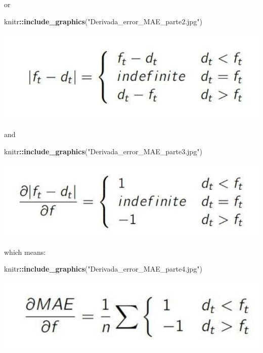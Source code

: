 \documentclass[
]{article}
\newenvironment{Shaded}{\begin{snugshade}}{\end{snugshade}}
\newcommand{\FunctionTok}[1]{\textcolor[rgb]{0.13,0.29,0.53}{\textbf{#1}}}
\newcommand{\NormalTok}[1]{#1}
\newcommand{\SpecialCharTok}[1]{\textcolor[rgb]{0.81,0.36,0.00}{\textbf{#1}}}
\newcommand{\StringTok}[1]{\textcolor[rgb]{0.31,0.60,0.02}{#1}}
\begin{document}
or

\begin{Shaded}
\begin{Highlighting}[]
\NormalTok{knitr}\SpecialCharTok{::}\FunctionTok{include\_graphics}\NormalTok{(}\StringTok{"Derivada\_error\_MAE\_parte2.jpg"}\NormalTok{)}
\end{Highlighting}
\end{Shaded}

\includegraphics{Derivada_error_MAE_parte2.jpg}

and

\begin{Shaded}
\begin{Highlighting}[]
\NormalTok{knitr}\SpecialCharTok{::}\FunctionTok{include\_graphics}\NormalTok{(}\StringTok{"Derivada\_error\_MAE\_parte3.jpg"}\NormalTok{)}
\end{Highlighting}
\end{Shaded}

\includegraphics{Derivada_error_MAE_parte3.jpg}

which means:

\begin{Shaded}
\begin{Highlighting}[]
\NormalTok{knitr}\SpecialCharTok{::}\FunctionTok{include\_graphics}\NormalTok{(}\StringTok{"Derivada\_error\_MAE\_parte4.jpg"}\NormalTok{)}
\end{Highlighting}
\end{Shaded}

\includegraphics{Derivada_error_MAE_parte4.jpg}
\end{document}
